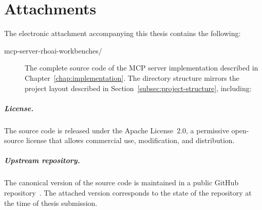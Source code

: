 \documentclass[
  digital,     %
  oneside,     %
  nosansbold,  %
  nocolorbold, %
  lof,         %
  lot,         %
]{fithesis4}
\begin{document}
\chapter*{Attachments}
\label{chap:attachments}

The electronic attachment accompanying this thesis contains the following:

\begin{description}
  \item[mcp-server-rhoai-workbenches/] The complete source code of the MCP server
        implementation described in Chapter~\ref{chap:implementation}.
        The directory structure mirrors the project layout described in
        Section~\ref{subsec:project-structure}, including:
\end{description}

\paragraph{License.}
The source code is released under the Apache License~2.0, a permissive
open-source license that allows commercial use, modification, and
distribution.

\paragraph{Upstream repository.}
The canonical version of the source code is maintained in a public
GitHub repository~\parencite{mcp-server-rhoai-repo}. The attached version
corresponds to the state of the repository at the time of thesis submission.

\printbibliography[heading=bibintoc]
\end{document}
